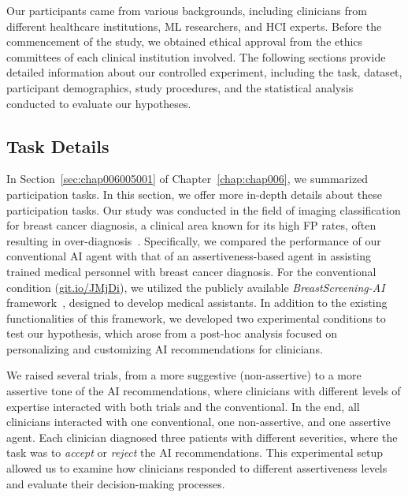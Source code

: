 \textcolor{revised}{Our participants came from various backgrounds, including clinicians from different healthcare institutions, \ac{ML} researchers, and \ac{HCI} experts.
Before the commencement of the study, we obtained ethical approval from the ethics committees of each clinical institution involved.
The following sections provide detailed information about our controlled experiment, including the task, dataset, participant demographics, study procedures, and the statistical analysis conducted to evaluate our hypotheses.}

\subsection{Task Details}
\label{sec:app005006001}


\textcolor{revised}{In Section~\ref{sec:chap006005001} of Chapter~\ref{chap:chap006}, we summarized participation tasks.
In this section, we offer more in-depth details about these participation tasks. Our study was conducted in the field of imaging classification for breast cancer diagnosis, a clinical area known for its high \ac{FP} rates, often resulting in over-diagnosis~\cite{KIM2020e138}.
Specifically, we compared the performance of our conventional \ac{AI} agent with that of an assertiveness-based agent in assisting trained medical personnel with breast cancer diagnosis.
For the conventional condition (\href{https://mida-project.github.io/prototype-multi-modality-assistant/}{git.io/JMjDi}), we utilized the publicly available {\it BreastScreening-AI} framework~\cite{CALISTO2022102285}, designed to develop medical assistants.
In addition to the existing functionalities of this framework, we developed two experimental conditions to test our hypothesis, which arose from a post-hoc analysis focused on personalizing and customizing \ac{AI} recommendations for clinicians.}

We raised several trials, from a more suggestive (non-assertive) to a more assertive tone of the \ac{AI} recommendations, where clinicians with different levels of expertise interacted with both trials and the conventional.
In the end, all clinicians interacted with one conventional, one non-assertive, and one assertive agent.
Each clinician diagnosed three patients with different severities, where the task was to {\it accept} or {\it reject} the \ac{AI} recommendations.
This experimental setup allowed us to examine how clinicians responded to different assertiveness levels and evaluate their decision-making processes.


